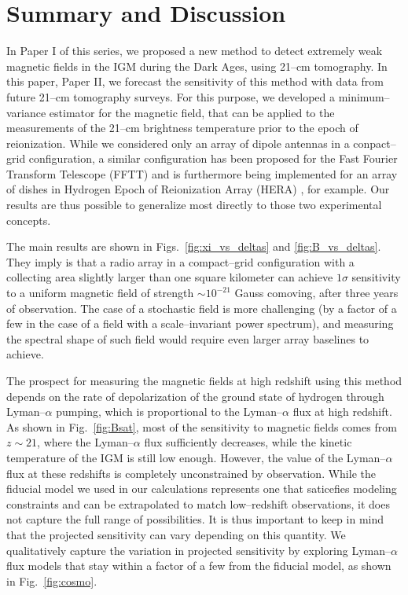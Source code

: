 \section{Summary and Discussion}
\label{sec:conclusions}

In Paper I of this series, we proposed a new method to detect extremely weak magnetic fields in the IGM during the Dark Ages, using 21--cm tomography. In this paper, Paper II, we forecast the sensitivity of this method with data from future 21--cm tomography surveys. For this purpose, we developed a minimum--variance estimator for the magnetic field, that can be applied to the measurements of the 21--cm brightness temperature prior to the epoch of reionization. While we considered only an array of dipole antennas in a conpact--grid configuration, a similar configuration has been proposed for the Fast Fourier Transform Telescope (FFTT) \cite{2009PhRvD..79h3530T} and is furthermore being implemented for an array of dishes in Hydrogen Epoch of Reionization Array (HERA) \cite{2015AAS...22532803D}, for example. Our results are thus possible to generalize most directly to those two experimental concepts.

The main results are shown in Figs.~\ref{fig:xi_vs_deltas} and \ref{fig:B_vs_deltas}. They imply is that a radio array in a compact--grid configuration with a collecting area slightly larger than one square kilometer can achieve $1\sigma$ sensitivity to a uniform magnetic field of strength $\sim10^{-21}$ Gauss comoving, after three years of observation. The case of a stochastic field is more challenging (by a factor of a few in the case of a field with a scale--invariant power spectrum), and measuring the spectral shape of such field would require even larger array baselines to achieve.

The prospect for measuring the magnetic fields at high redshift using this method depends on the rate of depolarization of the ground state of hydrogen through Lyman--$\alpha$ pumping, which is proportional to the Lyman--$\alpha$ flux at high redshift. As shown in Fig.~\ref{fig:Bsat}, most of the sensitivity to magnetic fields comes from $z\sim 21$, where the Lyman--$\alpha$ flux sufficiently decreases, while the kinetic temperature of the IGM is still low enough. However, the value of the Lyman--$\alpha$ flux at these redshifts is completely unconstrained by observation. While the fiducial model we used in our calculations represents one that saticefies modeling constraints and can be extrapolated to match low--redshift observations, it does not capture the full range of possibilities. It is thus important to keep in mind that the projected sensitivity can vary depending on this quantity. We qualitatively capture the variation in projected sensitivity by exploring Lyman--$\alpha$ flux models that stay within a factor of a few from the fiducial model, as shown in Fig.~\ref{fig:cosmo}.


